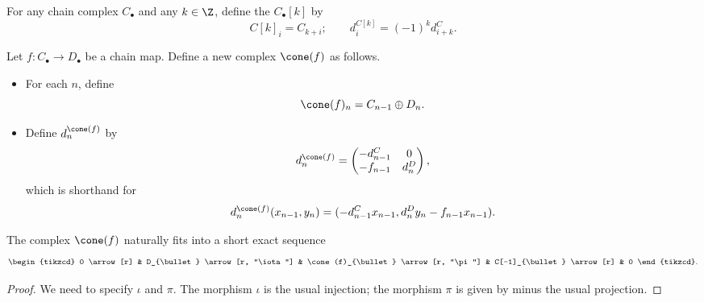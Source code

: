 \documentclass[main.tex]{subfiles}
\begin{document}
\begin{definition}
  \label{def:shift_functor}
  For any chain complex $C_{\bullet}$ and any $k \in \Z$, define the  $C_{\bullet}[k]$ by
  \begin{equation*}
    C[k]_{i} = C_{k+i};\qquad d^{C[k]}_{i} = (-1)^{k}d^{C}_{i+k}.
  \end{equation*}
\end{definition}

\begin{definition}
  \label{def:mapping_cone}
  Let $f\colon C_{\bullet} \to D_{\bullet}$ be a chain map. Define a new complex $\cone(f)$ as follows.
  \begin{itemize}
    \item For each $n$, define
      \begin{equation*}
        \cone(f)_{n} = C_{n-1} \oplus D_{n}.
      \end{equation*}

    \item Define $d^{\cone(f)}_{n}$ by
      \begin{equation*}
        d^{\cone(f)}_{n} =
        \begin{pmatrix}
          -d^{C}_{n-1} & 0 \\
          -f_{n-1} & d^{D}_{n}
        \end{pmatrix},
      \end{equation*}
      which is shorthand for
      \begin{equation*}
        d^{\cone(f)}_{n}(x_{n-1}, y_{n}) = (-d^{C}_{n-1}x_{n-1}, d^{D}_{n}y_{n} - f_{n-1}x_{n-1}).
      \end{equation*}
  \end{itemize}
\end{definition}

\begin{lemma}
  \label{lemma:cone_fits_into_ses}
  The complex $\cone(f)$ naturally fits into a short exact sequence
  \begin{equation*}
    \begin{tikzcd}
      0
      \arrow[r]
      & D_{\bullet}
      \arrow[r, "\iota"]
      & \cone(f)_{\bullet}
      \arrow[r, "\pi"]
      & C[-1]_{\bullet}
      \arrow[r]
      & 0
    \end{tikzcd}.
  \end{equation*}
\end{lemma}
\begin{proof}
  We need to specify $\iota$ and $\pi$. The morphism $\iota$ is the usual injection; the morphism $\pi$ is given by minus the usual projection.
\end{proof}
\end{document}
